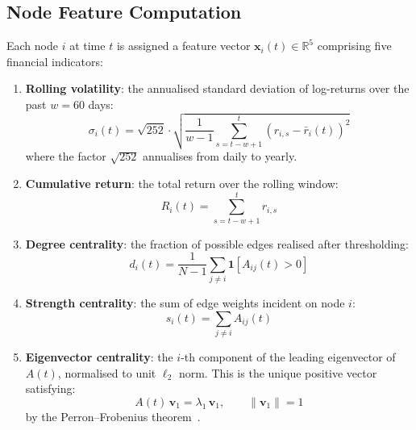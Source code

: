 \subsection{Node Feature Computation}
\label{sec:node-features}

Each node $i$ at time $t$ is assigned a feature vector $\mathbf{x}_i(t) \in \mathbb{R}^5$ comprising five financial indicators:

\begin{enumerate}
    \item \textbf{Rolling volatility}: the annualised standard deviation of log-returns over the past $w=60$ days:
    \begin{equation}
        \sigma_i(t) = \sqrt{252} \cdot \sqrt{\frac{1}{w-1}\sum_{s=t-w+1}^{t}\left(r_{i,s} - \bar{r}_i(t)\right)^2}
        \label{eq:volatility}
    \end{equation}
    where the factor $\sqrt{252}$ annualises from daily to yearly.

    \item \textbf{Cumulative return}: the total return over the rolling window:
    \begin{equation}
        R_i(t) = \sum_{s=t-w+1}^{t} r_{i,s}
        \label{eq:cumreturn}
    \end{equation}

    \item \textbf{Degree centrality}: the fraction of possible edges realised after thresholding:
    \begin{equation}
        d_i(t) = \frac{1}{N-1}\sum_{j \neq i} \mathbf{1}\!\left[A_{ij}(t) > 0\right]
        \label{eq:degree}
    \end{equation}

    \item \textbf{Strength centrality}: the sum of edge weights incident on node $i$:
    \begin{equation}
        s_i(t) = \sum_{j \neq i} A_{ij}(t)
        \label{eq:strength}
    \end{equation}

    \item \textbf{Eigenvector centrality}: the $i$-th component of the leading eigenvector of $A(t)$, normalised to unit $\ell_2$ norm. This is the unique positive vector satisfying:
    \begin{equation}
        A(t)\,\mathbf{v}_1 = \lambda_1 \,\mathbf{v}_1, \qquad \|\mathbf{v}_1\| = 1
        \label{eq:eigenvec}
    \end{equation}
    by the Perron--Frobenius theorem~\cite{golub2013matrix}.
\end{enumerate}

